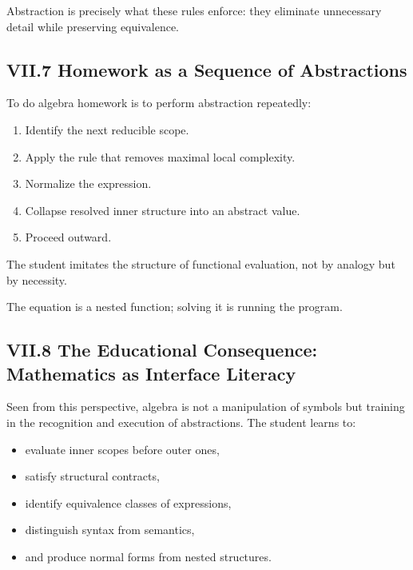 \documentclass[12pt,letterpaper]{article}
\begin{document}
Abstraction is precisely what these rules enforce: they eliminate unnecessary detail while preserving equivalence.

\subsection{VII.7 Homework as a Sequence of Abstractions}

To do algebra homework is to perform abstraction repeatedly:

\begin{enumerate}
    \item Identify the next reducible scope.
    \item Apply the rule that removes maximal local complexity.
    \item Normalize the expression.
    \item Collapse resolved inner structure into an abstract value.
    \item Proceed outward.
\end{enumerate}

The student imitates the structure of functional evaluation, not by analogy but by necessity.

The equation is a nested function; solving it is running the program.

\subsection{VII.8 The Educational Consequence: Mathematics as Interface Literacy}

Seen from this perspective, algebra is not a manipulation of symbols but training in the recognition and execution of abstractions. The student learns to:

\begin{itemize}
    \item evaluate inner scopes before outer ones,
    \item satisfy structural contracts,
    \item identify equivalence classes of expressions,
    \item distinguish syntax from semantics,
    \item and produce normal forms from nested structures.
\end{itemize}
\end{document}
